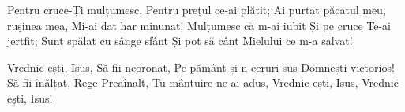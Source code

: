 \beginverse
Pentru cruce-Ți mulțumesc,
Pentru prețul ce-ai plătit;
Ai purtat păcatul meu, rușinea mea,
Mi-ai dat har minunat!
Mulțumesc că m-ai iubit
Și pe cruce Te-ai jertfit;
Sunt spălat cu sânge sfânt
Și pot să cânt Mielului ce m-a salvat!
\endverse

\beginchorus
Vrednic ești, Isus,
Să fii-ncoronat,
Pe pământ și-n ceruri sus
Domnești victorios!
Să fii înălțat, Rege Preaînalt,
Tu mântuire ne-ai adus,
Vrednic ești, Isus,
Vrednic ești, Isus!
\endchorus
\endsong